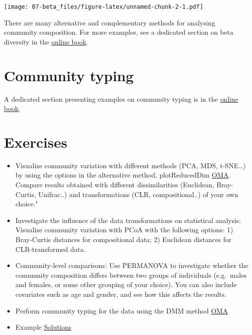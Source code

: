 \documentclass[
  oneside]{book}
\begin{document}
\texttt{[image: 07-beta\_files/figure-latex/unnamed-chunk-2-1.pdf]}

There are many alternative and complementary methods for analysing
community composition. For more examples, see a dedicated section on
beta diversity in the \href{https://microbiome.github.io/OMA/microbiome-diversity.html\#beta-diversity}{online
book}.

\hypertarget{community-typing}{%
\section{Community typing}\label{community-typing}}

A dedicated section presenting examples on community typing is in the
\href{https://microbiome.github.io/OMA/microbiome-community.html\#community-typing}{online book}.

\hypertarget{exercises-1}{%
\section{Exercises}\label{exercises-1}}

\begin{itemize}
\item
  Visualize community variation with different methods (PCA, MDS, t-SNE\ldots) by using the options in the alternative method, plotReducedDim \href{https://microbiome.github.io/OMA/microbiome-diversity.html\#estimating-beta-diversity}{OMA}. Compare results obtained with different dissimilarities (Euclidean, Bray-Curtis, Unifrac..) and transformations (CLR, compositional..) of your own choice."
\item
  Investigate the influence of the data transformations on
  statistical analysis: Visualize community variation with PCoA with
  the following options: 1) Bray-Curtis distances for compositional
  data; 2) Euclidean distances for CLR-transformed data.
\item
  Community-level comparisons: Use PERMANOVA to investigate whether
  the community composition differs between two groups of individuals
  (e.g.~males and females, or some other grouping of your
  choice). You can also include covariates such as age and gender,
  and see how this affects the results.
\item
  Perform community typing for the data using the DMM method \href{https://microbiome.github.io/OMA/microbiome-community.html\#community-typing}{OMA}
\item
  Example \href{08-5-ex-sol-ADHD.html}{Solutions}
\end{itemize}
\end{document}
